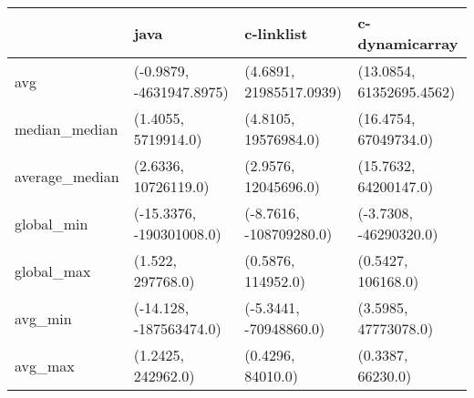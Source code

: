 \begin{tabular}{llll}
\toprule
{} &                      java &               c-linklist &            c-dynamicarray \\
\midrule
avg            &  (-0.9879, -4631947.8975) &  (4.6891, 21985517.0939) &  (13.0854, 61352695.4562) \\
median\_median  &       (1.4055, 5719914.0) &     (4.8105, 19576984.0) &     (16.4754, 67049734.0) \\
average\_median &      (2.6336, 10726119.0) &     (2.9576, 12045696.0) &     (15.7632, 64200147.0) \\
global\_min     &  (-15.3376, -190301008.0) &  (-8.7616, -108709280.0) &    (-3.7308, -46290320.0) \\
global\_max     &         (1.522, 297768.0) &       (0.5876, 114952.0) &        (0.5427, 106168.0) \\
avg\_min        &   (-14.128, -187563474.0) &   (-5.3441, -70948860.0) &      (3.5985, 47773078.0) \\
avg\_max        &        (1.2425, 242962.0) &        (0.4296, 84010.0) &         (0.3387, 66230.0) \\
\bottomrule
\end{tabular}
